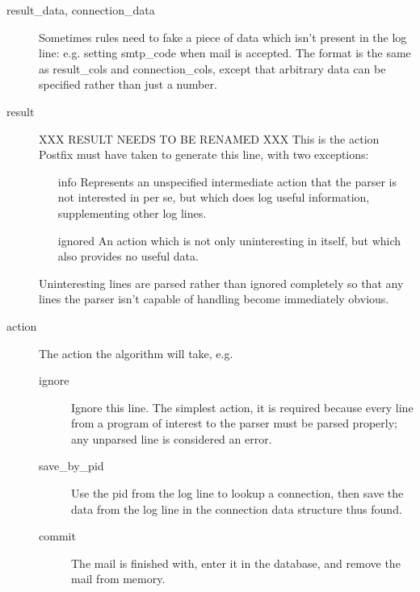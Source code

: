 \documentclass[a4paper,12pt,draft]{article}
\begin{document}
\begin{description}
    \item [result\_data, connection\_data] Sometimes rules need to fake a
        piece of data which isn't present in the log line: e.g. setting
        smtp\_code when mail is accepted.  The format is the same as
        result\_cols and connection\_cols, except that arbitrary data can
        be specified rather than just a number.

    \item [result]  XXX RESULT NEEDS TO BE RENAMED XXX This is the action
        Postfix must have taken to generate this line, with two exceptions:

        \begin{itemize}

            \item [info] Represents an unspecified intermediate action that
                the parser is not interested in per se, but which does log
                useful information, supplementing other log lines.

            \item [ignored] An action which is not only uninteresting in
                itself, but which also provides no useful data.

        \end{itemize}

        Uninteresting lines are parsed rather than ignored completely so
        that any lines the parser isn't capable of handling become
        immediately obvious.

    \item [action] The action the algorithm will take, e.g.
        \begin{description}

            \item [ignore] Ignore this line.  The simplest action, it is
                required because every line from a program of interest to
                the parser must be parsed properly; any unparsed line is
                considered an error.

            \item [save\_by\_pid] Use the pid from the log line to lookup a
                connection, then save the data from the log line in the
                connection data structure thus found.

            \item [commit] The mail is finished with, enter it in the
                database, and remove the mail from memory.


\end{description}
\end{description}
\end{document}
